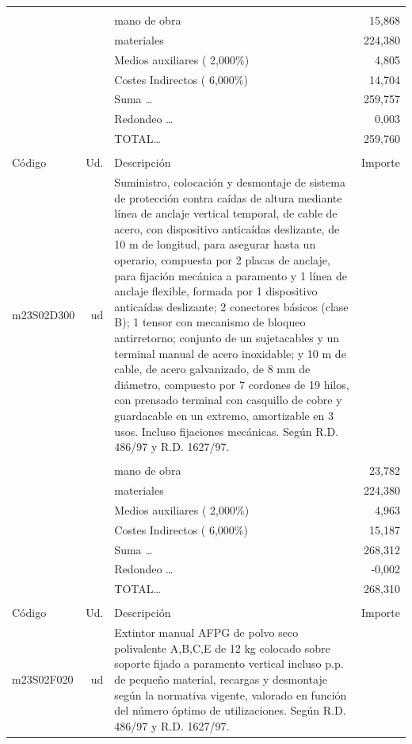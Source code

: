 \documentclass{book}%
\begin{document}
\begin{supertabular}{l r p{60mm} r}
&&&\\%
&&mano de obra&    15,868\\%
&&materiales&   224,380\\%
&&Medios auxiliares (     2,000\%)&     4,805\\%
&&Costes Indirectos (     6,000\%)&    14,704\\%
&&Suma \ldots&   259,757\\%
&&Redondeo \ldots&     0,003\\%
%
&&TOTAL\ldots&   259,760\\%
&&&\\%
Código&Ud.&Descripción&Importe\\%
\hline%
m23S02D300&ud&Suministro, colocación y desmontaje de sistema de protección contra caídas de altura mediante línea de anclaje vertical temporal, de cable de acero, con dispositivo anticaídas deslizante, de 10 m de longitud, para asegurar hasta un operario, compuesta por 2 placas de anclaje, para fijación mecánica a paramento y 1 línea de anclaje flexible, formada por 1 dispositivo anticaídas deslizante; 2 conectores básicos (clase B); 1 tensor con mecanismo de bloqueo antirretorno; conjunto de un sujetacables y un terminal manual de acero inoxidable; y 10 m de cable, de acero galvanizado, de 8 mm de diámetro, compuesto por 7 cordones de 19 hilos, con prensado terminal con casquillo de cobre y guardacable en un extremo, amortizable en 3 usos. Incluso fijaciones mecánicas. Según R.D. 486/97 y R.D. 1627/97.&\\%
&&&\\%
&&mano de obra&    23,782\\%
&&materiales&   224,380\\%
&&Medios auxiliares (     2,000\%)&     4,963\\%
&&Costes Indirectos (     6,000\%)&    15,187\\%
&&Suma \ldots&   268,312\\%
&&Redondeo \ldots&    {-}0,002\\%
%
&&TOTAL\ldots&   268,310\\%
&&&\\%
Código&Ud.&Descripción&Importe\\%
\hline%
m23S02F020&ud&Extintor manual AFPG de polvo seco polivalente A,B,C,E de 12 kg colocado sobre soporte fijado a paramento vertical incluso p.p. de pequeño material, recargas y desmontaje según la normativa vigente, valorado en función del número óptimo de utilizaciones. Según R.D. 486/97 y R.D. 1627/97.&\\%

\end{supertabular}
\end{document}
